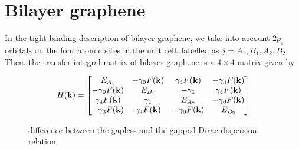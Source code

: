 \section{Bilayer graphene}

In the tight-binding description of bilayer graphene, we take into account $2p_z$ orbitals on the four atomic sites in the unit cell, labelled as $j = A_1, B_1, A_2, B_2$. Then, the transfer integral matrix of bilayer graphene is a $4\times 4$  matrix given by \cite{McCann_2013}

\begin{equation}
    H(\mathbf{k})=
    \begin{bmatrix}
        E_{A_1} & -\gamma_0 F(\mathbf{k}) & \gamma_4 F(\mathbf{k}) & -\gamma_3 F(\mathbf{k})\\
        -\gamma_0 F(\mathbf{k}) & E_{B_1} & -\gamma_1 & \gamma_4 F(\mathbf{k})\\
        \gamma_4 F(\mathbf{k}) & \gamma_1 & E_{A_2} & -\gamma_0 F(\mathbf{k})\\
        -\gamma_3 F(\mathbf{k})& \gamma_4 F(\mathbf{k})& -\gamma_0 F(\mathbf{k}) & E_{B_2}
    \end{bmatrix}
\end{equation}
\begin{figure}[h]
    \caption{difference between the gapless and the gapped Dirac dispersion relation}
    \label{fig:bilayer-lattice}
\end{figure}
